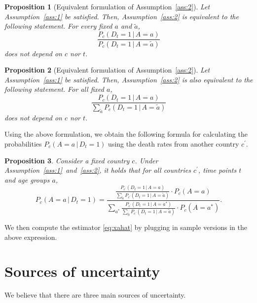 \documentclass[a4paper]{article}
\newtheorem{prop}{Proposition}
\newcommand{\given}{\, \vert \,}
\newcommand\Niklas[1]{{\color{Fuchsia}Niklas: #1}}
\begin{document}
\begin{prop}[Equivalent formulation of Assumption~\ref{ass:2}] \label{prop:equiv1}
Let Assumption~\ref{ass:1} be satisfied. Then, Assumption~\ref{ass:2} is equivalent to the following statement. 
For every fixed $a$ and $\tilde{a}$, 
\begin{equation*} \label{eq:a2equiv2}
\frac{P_c(D_t = 1\,|\,A = a)}{P_c(D_t = 1\,|\,A = \tilde{a})}
\end{equation*}
does not depend on $c$ nor $t$.
\end{prop}
%
%
\begin{prop}[Equivalent formulation of Assumption~\ref{ass:2}] \label{prop:equiv2}
Let Assumption~\ref{ass:1} be satisfied. Then, Assumption~\ref{ass:2} is also equivalent to the following statement. 
For all fixed $a$,  
\begin{equation} \label{eq:equiv2}
\frac{P_c(D_t = 1 \given A = a)}
{\sum_{\tilde{a}} P_c(D_t = 1 \given A = \tilde{a})}
\end{equation}
%
does not depend on $c$ nor $t$. 
\end{prop}
%
%
Using the above formulation, we obtain the following formula for calculating the probabilities 
$P_c(A=a \given D_t = 1)$ using the death rates from another country $c^\prime$.
%
\begin{prop} \label{prop:estimator}
Consider a fixed country $c$. Under Assumption~\ref{ass:1}~and~\ref{ass:2}, 
it holds that for all countries $c^\prime$, time points $t$ and age groups $a$, 
\begin{equation*}
P_{c}(A = a \given D_t = 1) =
\frac{
  \frac{
    P_{c^\prime}(D_t = 1\given A = a)}
    {\sum_{\tilde{a}} P_{c^\prime}(D_t = 1 \given A = \tilde{a})} \cdot P_{c}(A = a)}
  {\sum_{a^*}  
  \frac{
    P_{c^\prime}(D_t = 1\given A = a^*)}
    {\sum_{\tilde{a}} P_{c^\prime}(D_t = 1 \given A = \tilde{a})} \cdot P_{c}(A = a^*)}.
\end{equation*}
\end{prop}
%
We then compute the estimator \eqref{eq:xahat} by plugging in sample versions in the 
above expression. 



\section{Sources of uncertainty} \label{sec:uncert} We believe that
there are three main sources of uncertainty.
\end{document}
